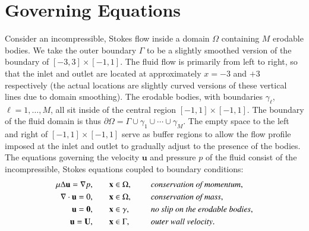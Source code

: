 \documentclass[3p]{elsarticle}
\newcommand{\bd}{{\partial}}
\newcommand{\grad}{{\nabla}}
\newcommand{\uu}{{\mathbf{u}}}
\newcommand{\UU}{{\mathbf{U}}}
\newcommand{\xx}{{\mathbf{x}}}
\def\gap{\hspace*{.2in}}
\begin{document}
\section{Governing Equations}
\label{sec:formulation}

Consider an incompressible, Stokes flow inside a domain $\Omega$ containing $M$ erodable bodies. We take the outer boundary $\Gamma$ to be a slightly smoothed version of the boundary of $[-3,3] \times [-1,1]$. The fluid flow is primarily from left to right, so that the inlet and outlet are located at approximately $x=-3$ and $+3$ respectively (the actual locations are slightly curved versions of these vertical lines due to domain smoothing). The erodable bodies, with boundaries $\gamma_\ell$, $\ell = 1,\ldots,M$, all sit inside of the central region $[-1,1] \times [-1,1]$. The boundary of the fluid domain is thus $\bd \Omega = \Gamma \cup \gamma_1 \cup \cdots \cup \gamma_M$. 
The empty space to the left and right of $[-1,1] \times [-1,1]$ serve as buffer regions to allow the flow profile imposed at the inlet and outlet to gradually adjust to the presence of the bodies. The equations governing the velocity $\uu$ and pressure $p$ of the fluid consist of the incompressible, Stokes equations coupled to boundary conditions:
\begin{equation}
\label{eqn:StokesEq}
  \begin{split}
    \mu \Delta \uu = \grad p, &\hspace{20pt} \xx \in \Omega, \gap 
      &&\mbox{\em conservation of momentum}, \\
    \grad \cdot \uu = 0, &\hspace{20pt} \xx \in \Omega, \gap 
      &&\mbox{\em conservation of mass}, \\
    \uu = \mathbf{0}, &\hspace{20pt} \xx \in \gamma, \gap 
      &&\mbox{\em no slip on the erodable bodies}, \\
    \uu = \UU, &\hspace{20pt} \xx \in \Gamma, \gap 
      &&\mbox{\em outer wall velocity}.
  \end{split}
\end{equation}
\end{document}
